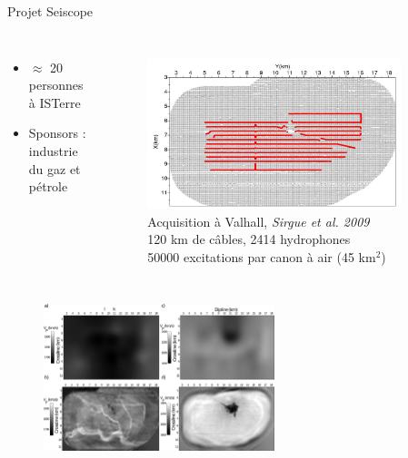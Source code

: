 \begin{frame}{Projet Seiscope}
	\begin{columns}
		\centering
		\begin{itemize}
			\item $\approx$ 20 personnes à ISTerre
			\item Sponsors : industrie du gaz et pétrole
		\end{itemize}
		\centering
		\begin{figure}
			\vspace{-1cm}
			\includegraphics[width=0.9\textwidth]{img/dispo_valhall.jpg}\\
			{ \centering \scriptsize{Acquisition à Valhall, \itshape{ Sirgue et al. 2009}}\\
			120 km de câbles, 2414 hydrophones\\[-0.1cm]
			 50000 excitations par canon à air (45 km$^2$)}
		\end{figure}
	\end{columns}
	
	\begin{figure}
		\includegraphics[width=0.6\textwidth]{img/geophy.png}\\
	\end{figure}
\end{frame}



